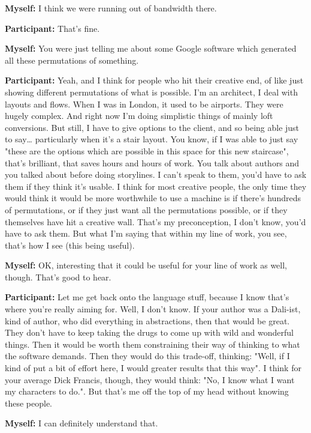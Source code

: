 \documentclass[11pt]{report}
\newcommand{\llabel}[1]{\hypertarget{llineno:#1}{\linelabel{#1}}}
\begin{document}
\begin{linenumbers}
\textbf{Myself:} I think we were running out of bandwidth there.

\textbf{Participant:} That's fine.

\textbf{Myself:} You were just telling me about some Google software which generated all these permutations of something.

\textbf{Participant:} Yeah, and I think for people who hit their creative end, of like just showing different permutations of what is possible. I'm an architect, I deal with layouts and flows. When I was in London, it used to be airports. They were hugely complex. And right now I'm doing simplistic things of mainly loft conversions. But still, I have to give options to the client, and so being able just to say\ldots{} particularly when it's a stair layout. You know, if I was able to just say "these are the options which are possible in this space for this new staircase", that's brilliant, that saves hours and hours of work. You talk about authors and you talked about before doing storylines. I can't speak to them, you'd have to ask them if they think it's usable. I think for most creative people, the only time they would think it would be more worthwhile to use a machine is if there's hundreds of permutations, or if they just want all the permutations possible, or if they themselves have hit a creative wall. That's my preconception, I don't know, you'd have to ask them. But what I'm saying that within my line of work, you see, that's how I see (this being useful).\llabel{lne:use2b2}

\textbf{Myself:} OK, interesting that it could be useful for your line of work as well, though. That's good to hear.

\textbf{Participant:} Let me get back onto the language stuff, because I know that's where you're really aiming for. Well, I don't know. If your author was a Dali-ist, kind of author, who did everything in abstractions, then that would be great. They don't have to keep taking the drugs to come up with wild and wonderful things. Then it would be worth them constraining their way of thinking to what the software demands. Then they would do this trade-off, thinking: "Well, if I kind of put a bit of effort here, I would greater results that this way". I think for your average Dick Francis, though, they would think: "No, I know what I want my characters to do.". But that's me off the top of my head without knowing these people.\llabel{lne:use2b3}

\textbf{Myself:} I can definitely understand that.
\end{linenumbers}
\resetlinenumber[1]
\end{document}
